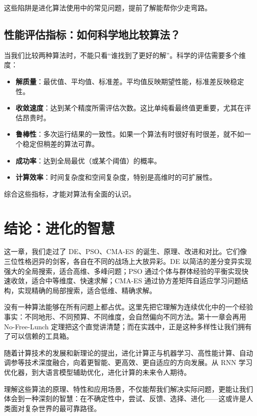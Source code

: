 \documentclass[lang=cn,zihao=-4,a4paper,fontset=windows]{beautybook}
\begin{document}
这些陷阱是进化算法使用中的常见问题，提前了解能帮你少走弯路。

\subsection{性能评估指标：如何科学地比较算法？}

当我们比较两种算法时，不能只看“谁找到了更好的解”。科学的评估需要多个维度：

\begin{itemize}
    \item \textbf{解质量}：最优值、平均值、标准差。平均值反映期望性能，标准差反映稳定性。
    \item \textbf{收敛速度}：达到某个精度所需评估次数。这比单纯看最终值更重要，尤其在评估昂贵时。
    \item \textbf{鲁棒性}：多次运行结果的一致性。如果一个算法有时很好有时很差，就不如一个稳定但稍差的算法可靠。
    \item \textbf{成功率}：达到全局最优（或某个阈值）的概率。
    \item \textbf{计算效率}：时间复杂度和空间复杂度，特别是高维时的可扩展性。
\end{itemize}

综合这些指标，才能对算法有全面的认识。

\section{结论：进化的智慧}

这一章，我们走过了 DE、PSO、CMA-ES 的诞生、原理、改进和对比。它们像三位性格迥异的剑客，各自在不同的战场上大放异彩。DE 以简洁的差分变异实现强大的全局搜索，适合高维、多峰问题；PSO 通过个体与群体经验的平衡实现快速收敛，适合中等维度、快速求解；CMA-ES 通过协方差矩阵自适应学习问题结构，实现精确的局部搜索，适合低维、精确求解。

没有一种算法能够在所有问题上都占优。这里先把它理解为连续优化中的一个经验事实：不同地形、不同预算、不同维度，会自然偏向不同方法。第十一章会再用 No-Free-Lunch 定理把这个直觉讲清楚；而在实践中，正是这种多样性让我们拥有了可以信赖的工具箱。

随着计算技术的发展和新理论的提出，进化计算正与机器学习、高性能计算、自动调参等技术深度融合，向着更智能、更高效、更自适应的方向发展。从 RNN 学习优化器，到大语言模型辅助优化，进化计算的未来令人期待。

理解这些算法的原理、特性和应用场景，不仅能帮我们解决实际问题，更能让我们体会到一种深刻的智慧：在不确定性中，尝试、反馈、选择、进化——这或许是人类面对复杂世界的最可靠路径。
\end{document}
